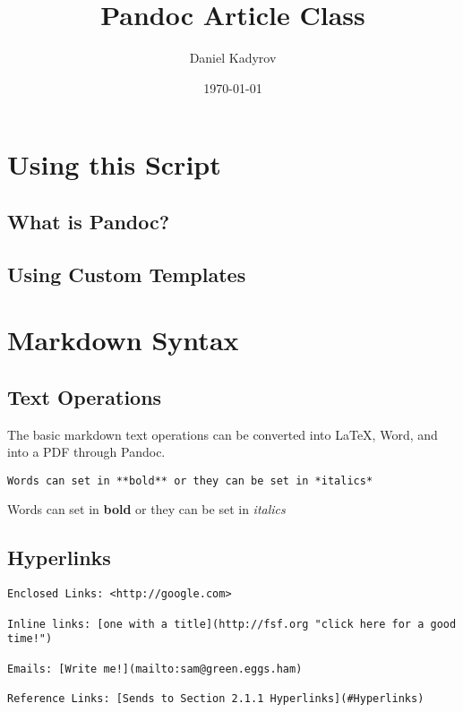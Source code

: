 \documentclass{web_article}
\title{Pandoc Article Class}
\author{Daniel Kadyrov}
\date{\today}
\begin{document}
\maketitle


\section{Using this Script}\label{using-this-script}

\subsection{What is Pandoc?}\label{what-is-pandoc}

\subsection{Using Custom Templates}\label{using-custom-templates}

\newpage

\section{Markdown Syntax}\label{markdown-syntax}

\subsection{Text Operations}\label{text-operations}

The basic markdown text operations can be converted into LaTeX, Word,
and into a PDF through Pandoc.

\begin{lstlisting}
Words can set in **bold** or they can be set in *italics*
\end{lstlisting}

Words can set in \textbf{bold} or they can be set in \emph{italics}

\subsection{Hyperlinks}\label{hyperlinks}

\begin{lstlisting}
Enclosed Links: <http://google.com>

Inline links: [one with a title](http://fsf.org "click here for a good time!")

Emails: [Write me!](mailto:sam@green.eggs.ham)

Reference Links: [Sends to Section 2.1.1 Hyperlinks](#Hyperlinks)
\end{lstlisting}
\end{document}
